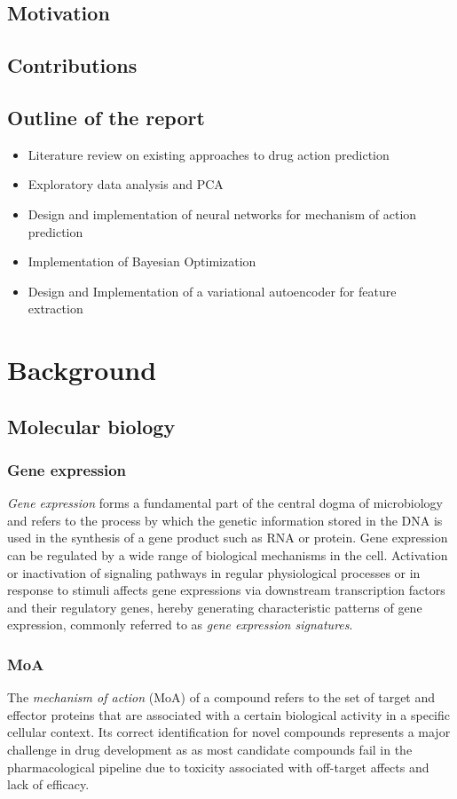\documentclass[bsc,frontabs,twoside,singlespacing,parskip,deptreport]{infthesis}     %
\begin{document}
\section{Motivation}
\section{Contributions}
\section{Outline of the report}
\begin{itemize}
\item Literature review on existing approaches to drug action prediction 
\item Exploratory data analysis and PCA
\item Design and implementation of neural networks for mechanism of action prediction
\item Implementation of Bayesian Optimization
\item Design and Implementation of a variational autoencoder for feature extraction

\end{itemize}



\chapter{Background}
\section{Molecular biology}
\subsection{Gene expression}
\textit{Gene expression} forms a fundamental part of the central dogma of microbiology \cite{crick_protein_1958} and refers to the process by which the genetic information stored in the DNA is used in the synthesis of a gene product such as RNA or protein. Gene expression can be regulated by a wide range of biological mechanisms in the cell. Activation or inactivation of signaling pathways in regular physiological processes or in response to stimuli affects gene expressions via downstream transcription factors and their regulatory genes, hereby generating characteristic patterns of gene expression, commonly referred to as \textit{gene expression signatures}.
\subsection{MoA}
The \textit{mechanism of action} (MoA) of a compound refers to the set of target and effector proteins that are associated with a certain biological activity in a specific cellular context. Its correct identification for novel compounds represents a major challenge in drug development as as most candidate compounds fail in the pharmacological pipeline due to toxicity associated with off-target affects and lack of efficacy\cite{wehling_assessing_2009}.
\end{document}
